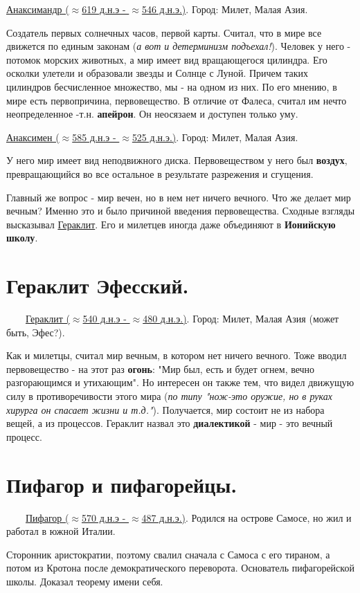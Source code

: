 \underline{Анаксимандр ($\approx$619 д.н.э - $\approx$546 д.н.э.)}. Город: Милет, Малая Азия.

Создатель первых солнечных часов, первой карты.
Считал, что в мире все движется по единым законам (\textit{а вот и детерминизм подъехал!}). Человек у него - потомок морских животных, а мир имеет вид вращающегося цилиндра. Его осколки улетели и образовали звезды и Солнце с Луной. Причем таких цилиндров бесчисленное множество, мы - на одном из них.
По его мнению, в мире есть первопричина, первовещество. В отличие от Фалеса, считал им нечто неопределенное -т.н. \textbf{апейрон}. Он неосязаем и доступен только уму.

\underline{Анаксимен ($\approx$585 д.н.э - $\approx$525 д.н.э.)}. Город: Милет, Малая Азия.

У него мир имеет вид неподвижного диска. 
Первовеществом у него был \textbf{воздух}, превращающийся во все остальное в результате разрежения и сгущения.

Главный же вопрос - мир вечен, но в нем нет ничего вечного. Что же делает мир вечным? Именно это и было причиной введения первовещества. Сходные взгляды высказывал \underline{Гераклит}. Его и милетцев иногда даже объединяют в \textbf{Ионийскую школу}.

\section{Гераклит Эфесский.}
\ \ \ \
\underline{Гераклит ($\approx$540 д.н.э - $\approx$480 д.н.э.)}. Город: Милет, Малая Азия (может быть, Эфес?).

Как и милетцы, считал мир вечным, в котором нет ничего вечного. Тоже вводил первовещество - на этот раз \textbf{огонь}: "Мир был, есть и будет огнем, вечно разгорающимся и утихающим". Но интересен он также тем, что видел движущую силу в противоречивости этого мира (\textit{по типу "нож-это оружие, но в руках хирурга он спасает жизни и т.д."}). Получается, мир состоит не из набора вещей, а из процессов. Гераклит назвал это \textbf{диалектикой} - мир - это вечный процесс. 

\section{Пифагор и пифагорейцы.}
\ \ \ \
\underline{Пифагор ($\approx$570 д.н.э - $\approx$487 д.н.э.)}. Родился на острове Самосе, но жил и работал в южной Италии.

Сторонник аристократии, поэтому свалил сначала с Самоса с его тираном, а потом из Кротона после демократического переворота.
Основатель пифагорейской школы. Доказал теорему имени себя.

